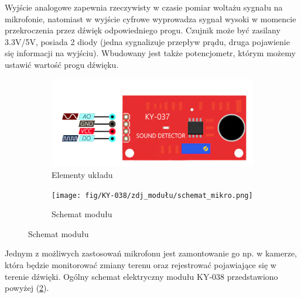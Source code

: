 \documentclass[11pt, a4paper]{article}
\begin{document}
\vspace{0.75cm}
Wyjście analogowe zapewnia rzeczywisty w czasie pomiar woltażu sygnału na mikrofonie, natomiast w wyjście cyfrowe wyprowadza sygnał wysoki w momencie przekroczenia przez dźwięk odpowiedniego progu. Czujnik może być zasilany 3.3V/5V, posiada 2 diody (jedna sygnalizuje przepływ prądu, druga pojawienie się informacji na wyjściu). Wbudowany jest także potencjometr, którym możemy ustawić wartość progu dźwięku. 

\begin{figure}[h]
\centering
\begin{subfigure}{.5\textwidth}
\centering
\includegraphics[width=.8\linewidth]{fig/KY-038/zasada_dzialania/uklad.png}
\caption{Elementy układu \cite{modul}}
\label{fig:_zdjecie_modulu}
\end{subfigure}%
\begin{subfigure}{.5\textwidth}
\centering
\texttt{[image: fig/KY-038/zdj\_modułu/schemat\_mikro.png]}
\caption{Schemat modułu \cite{schemat}}
\label{fig:_schemat_modulu}
\end{subfigure}
\label{fig:modul}
\end{figure}
\vspace{0.5cm}

Jednym z możliwych zastosowań mikrofonu jest zamontowanie go np. w kamerze, która będzie monitorować zmiany terenu oraz rejestrować pojawiające się w terenie dźwięki. 
\newline
Ogólny schemat elektryczny modułu KY-038 przedstawiono powyżej (\ref{fig:_schemat_modulu}).
\end{document}

